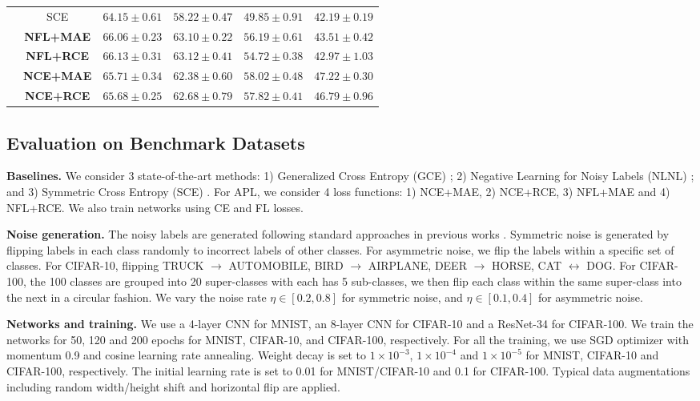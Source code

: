 \documentclass{article}
\begin{document}
\begin{table*}[!t]
\begin{tabular}{c|c|cccc}
 & SCE & $ 64.15\pm0.61 $  & $ 58.22\pm0.47 $  & $ 49.85\pm0.91 $  & $ 42.19\pm0.19 $ \\
 \cline{2-6}
& \textbf{NFL+MAE} & $ \boldsymbol{66.06\pm0.23} $  & $ \boldsymbol{63.10\pm0.22} $  & $ 56.19\pm0.61 $  & $ 43.51\pm0.42 $ \\
& \textbf{NFL+RCE} & $ \boldsymbol{66.13\pm0.31} $  & $ \boldsymbol{63.12\pm0.41} $  & $ 54.72\pm0.38 $  & $ 42.97\pm1.03 $ \\
& \textbf{NCE+MAE} & $ 65.71\pm0.34 $  & $ 62.38\pm0.60 $  & $ \boldsymbol{58.02\pm0.48} $  & $ \boldsymbol{47.22\pm0.30} $ \\
& \textbf{NCE+RCE} & $ 65.68\pm0.25 $  & $ 62.68\pm0.79 $  & $ \boldsymbol{57.82\pm0.41} $  & $ \boldsymbol{46.79\pm0.96} $ \\
\hline
\end{tabular}
\end{table*}

\subsection{Evaluation on Benchmark Datasets}\label{sec:benckmark_robust}

\noindent\textbf{Baselines.} We consider 3 state-of-the-art methods: 1) Generalized Cross Entropy (GCE) \cite{zhang2018generalized}; 2) Negative Learning for Noisy Labels (NLNL) \cite{kim2019nlnl}; and 3) Symmetric Cross Entropy (SCE) \cite{wang2019symmetric}. For APL, we consider 4 loss functions: 1) NCE+MAE, 2) NCE+RCE, 3) NFL+MAE and 4) NFL+RCE. We also train networks using CE and FL losses.

\noindent\textbf{Noise generation.}
The noisy labels are generated following standard approaches in previous works \cite{patrini2017making,ma2018dimensionality}.
Symmetric noise is generated by flipping labels in each class randomly to incorrect labels of other classes. For asymmetric noise, we flip the labels within a specific set of classes. For CIFAR-10, flipping TRUCK $\to$ AUTOMOBILE, BIRD $\to$ AIRPLANE, DEER $\to$ HORSE, CAT $\leftrightarrow$ DOG. For CIFAR-100, the 100 classes are grouped into 20 super-classes with each has 5 sub-classes, we then flip each class within the same super-class into the next in a circular fashion.
We vary the noise rate $\eta \in [0.2, 0.8]$ for symmetric noise, and $\eta \in [0.1, 0.4]$ for asymmetric noise.

\noindent\textbf{Networks and training.}
We use a 4-layer CNN for MNIST, an 8-layer CNN for CIFAR-10 and a ResNet-34 for CIFAR-100. We train the networks for 50, 120 and 200 epochs for MNIST, CIFAR-10, and CIFAR-100, respectively. For all the training, we use SGD optimizer with momentum 0.9 and cosine learning rate annealing. Weight decay is set to $1\times 10^{-3}$, $1\times 10^{-4}$ and $1\times 10^{-5}$ for MNIST, CIFAR-10 and CIFAR-100, respectively. The initial learning rate is set to 0.01 for MNIST/CIFAR-10 and 0.1 for CIFAR-100. Typical data augmentations including random width/height shift and horizontal flip are applied.
\end{document}
